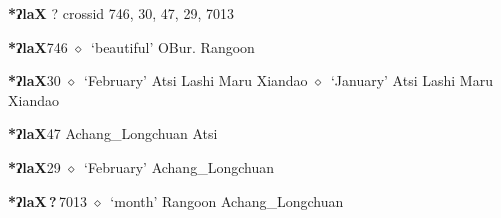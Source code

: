 \item
\textbf{*ʔlaX}
?
  {\tiny crossid 746, 30, 47, 29, 7013}
  \begin{list}{}{\leftmargin=1.5em \itemindent=-1.5em}
  \item {\footnotesize \textbf{*ʔlaX}}{\tiny 746}
         $\diamond$~`beautiful'
         OBur. 
\hspace{1ex}
         Rangoon 
  \item {\footnotesize \textbf{*ʔlaX}}{\tiny 30}
\hspace{1ex}
         $\diamond$~`February'
         Atsi 
\hspace{1ex}
         Lashi 
\hspace{1ex}
         Maru 
\hspace{1ex}
         Xiandao 
\hspace{1ex}
         $\diamond$~`January'
         Atsi 
\hspace{1ex}
         Lashi 
\hspace{1ex}
         Maru 
\hspace{1ex}
         Xiandao 
  \item {\footnotesize \textbf{*ʔlaX}}{\tiny 47}
\hspace{1ex}
         Achang\_Longchuan 
\hspace{1ex}
         Atsi 
  \item {\footnotesize \textbf{*ʔlaX}}{\tiny 29}
\hspace{1ex}
         $\diamond$~`February'
         Achang\_Longchuan 
  \item {\footnotesize \textbf{*ʔlaX\,?\,}}{\tiny 7013}
\hspace{1ex}
         $\diamond$~`month'
         Rangoon 
\hspace{1ex}
         Achang\_Longchuan 

\end{list}
